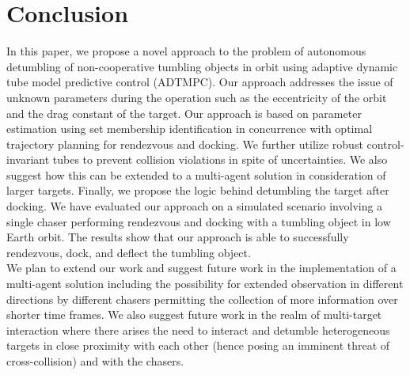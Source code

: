 \section{Conclusion}
In this paper, we propose a novel approach to the problem of autonomous detumbling of non-cooperative tumbling objects in orbit using adaptive dynamic tube model predictive control (ADTMPC).
Our approach addresses the issue of unknown parameters during the operation such as the eccentricity of the orbit and the drag constant of the target.
Our approach is based on parameter estimation using set membership identification in concurrence with optimal trajectory planning for rendezvous and docking.
We further utilize robust control-invariant tubes to prevent collision violations in spite of uncertainties.
We also suggest how this can be extended to a multi-agent solution in consideration of larger targets.
Finally, we propose the logic behind detumbling the target after docking.
We have evaluated our approach on a simulated scenario involving a single chaser performing rendezvous and docking with a tumbling object in low Earth orbit.
The results show that our approach is able to successfully rendezvous, dock, and deflect the tumbling object.\\
We plan to extend our work and suggest future work in the implementation of a multi-agent solution including the possibility for extended observation in different directions by different chasers permitting the collection of more information over shorter time frames.
We also suggest future work in the realm of multi-target interaction where there arises the need to interact and detumble heterogeneous targets in close proximity with each other (hence posing an imminent threat of cross-collision) and with the chasers.